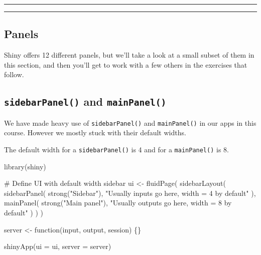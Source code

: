 \documentclass[
  letterpaper,
  DIV=11,
  numbers=noendperiod]{scrreprt}
\newenvironment{Shaded}{\begin{snugshade}}{\end{snugshade}}
\newcommand{\AttributeTok}[1]{\textcolor[rgb]{0.40,0.46,0.14}{#1}}
\newcommand{\CommentTok}[1]{\textcolor[rgb]{0.37,0.37,0.37}{#1}}
\newcommand{\ControlFlowTok}[1]{\textcolor[rgb]{0.00,0.46,0.62}{#1}}
\newcommand{\FunctionTok}[1]{\textcolor[rgb]{0.28,0.35,0.67}{#1}}
\newcommand{\NormalTok}[1]{\textcolor[rgb]{0.00,0.46,0.62}{#1}}
\newcommand{\OtherTok}[1]{\textcolor[rgb]{0.00,0.46,0.62}{#1}}
\newcommand{\StringTok}[1]{\textcolor[rgb]{0.13,0.47,0.30}{#1}}
\begin{document}
\begin{center}\rule{0.5\linewidth}{0.5pt}\end{center}

\begin{center}\rule{0.5\linewidth}{0.5pt}\end{center}

\hypertarget{panels-1}{%
\subsection{Panels}\label{panels-1}}

Shiny offers 12 different panels, but we'll take a look at a small
subset of them in this section, and then you'll get to work with a few
others in the exercises that follow.

\hypertarget{sidebarpanel-and-mainpanel}{%
\subsection{\texorpdfstring{\texttt{sidebarPanel()} and
\texttt{mainPanel()}}{sidebarPanel() and mainPanel()}}\label{sidebarpanel-and-mainpanel}}

We have made heavy use of \texttt{sidebarPanel()} and
\texttt{mainPanel()} in our apps in this course. However we mostly stuck
with their default widths.

The default width for a \texttt{sidebarPanel()} is 4 and for a
\texttt{mainPanel()} is 8.

\begin{Shaded}
\begin{Highlighting}[]
\FunctionTok{library}\NormalTok{(shiny)}

\CommentTok{\# Define UI with default width sidebar}
\NormalTok{ui }\OtherTok{\textless{}{-}} \FunctionTok{fluidPage}\NormalTok{(}
  \FunctionTok{sidebarLayout}\NormalTok{(}
    \FunctionTok{sidebarPanel}\NormalTok{(}
      \FunctionTok{strong}\NormalTok{(}\StringTok{"Sidebar"}\NormalTok{),}
      \StringTok{"Usually inputs go here, width = 4 by default"}
\NormalTok{      ),}
    \FunctionTok{mainPanel}\NormalTok{(}
      \FunctionTok{strong}\NormalTok{(}\StringTok{"Main panel"}\NormalTok{),}
      \StringTok{"Usually outputs go here, width = 8 by default"}
\NormalTok{      )}
\NormalTok{  )}
\NormalTok{)}

\NormalTok{server }\OtherTok{\textless{}{-}} \ControlFlowTok{function}\NormalTok{(input, output, session) \{\}}

\FunctionTok{shinyApp}\NormalTok{(}\AttributeTok{ui =}\NormalTok{ ui, }\AttributeTok{server =}\NormalTok{ server)}
\end{Highlighting}
\end{Shaded}
\end{document}

